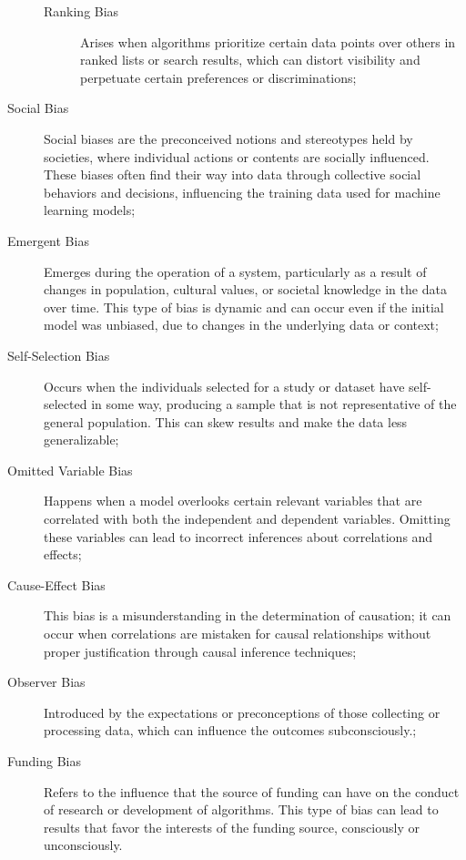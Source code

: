 \begin{description}
\begin{description}
        \item[Ranking Bias] Arises when algorithms prioritize certain data points over others in ranked lists or search results, which can distort visibility and perpetuate certain preferences or discriminations;
    \end{description}
    
    \item[Social Bias] Social biases are the preconceived notions and stereotypes held by societies, where individual actions or contents are socially influenced. These biases often find their way into data through collective social behaviors and decisions, influencing the training data used for machine learning models;

    \item[Emergent Bias] Emerges during the operation of a system, particularly as a result of changes in population, cultural values, or societal knowledge in the data over time. This type of bias is dynamic and can occur even if the initial model was unbiased, due to changes in the underlying data or context;

    \item[Self-Selection Bias] Occurs when the individuals selected for a study or dataset have self-selected in some way, producing a sample that is not representative of the general population. This can skew results and make the data less generalizable;

    \item[Omitted Variable Bias] Happens when a model overlooks certain relevant variables that are correlated with both the independent and dependent variables. Omitting these variables can lead to incorrect inferences about correlations and effects;

    \item[Cause-Effect Bias] This bias is a misunderstanding in the determination of causation; it can occur when correlations are mistaken for causal relationships without proper justification through causal inference techniques;

    \item[Observer Bias] Introduced by the expectations or preconceptions of those collecting or processing data, which can influence the outcomes subconsciously.;
    
    \item[Funding Bias] Refers to the influence that the source of funding can have on the conduct of research or development of algorithms. This type of bias can lead to results that favor the interests of the funding source, consciously or unconsciously.
\end{description}

